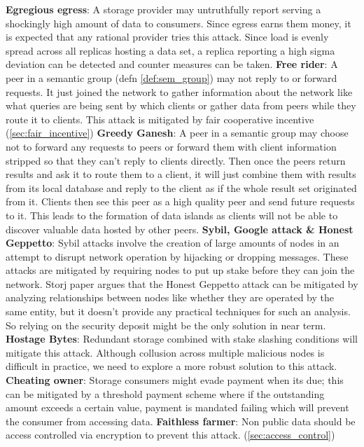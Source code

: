 \newline\newline
\textbf{Egregious egress}: A storage provider may untruthfully report serving a shockingly high amount of data to consumers. Since egress earns them money, it is expected that any rational provider tries this attack. Since load is evenly spread across all replicas hosting a data set, a replica reporting a high sigma deviation can be detected and counter measures can be taken. 
\newline\newline
\textbf{Free rider}: A peer in a semantic group (defn \ref{def:sem_group}) may not reply to or forward requests. It just joined the network to gather information about the network like what queries are being sent by which clients or gather data from peers while they route it to clients. This attack is mitigated by fair cooperative incentive (\cref{sec:fair_incentive})
\newline\newline
\textbf{Greedy Ganesh}: A peer in a semantic group may choose not to forward any requests to peers or forward them with client information stripped so that they can't reply to clients directly. Then once the peers return results and ask it to route them to a client, it will just combine them with results from its local database and reply to the client as if the whole result set originated from it. Clients then see this peer as a high quality peer and send future requests to it. This leads to the formation of data islands as clients will not be able to discover valuable data hosted by other peers.
\newline\newline
\textbf{Sybil, Google attack \& Honest Geppetto}: Sybil attacks involve the creation of large amounts of nodes in an attempt to disrupt network operation by hijacking or dropping messages. These attacks are mitigated by requiring nodes to put up stake before they can join the network. Storj paper \cite{Storj} argues that the Honest Geppetto attack can be mitigated by analyzing relationships between nodes like whether they are operated by the same entity, but it doesn't provide any practical techniques for such an analysis. So relying on the security deposit might be the only solution in near term.
\newline\newline
\textbf{Hostage Bytes}: Redundant storage combined with stake slashing conditions will mitigate this attack. Although collusion across multiple malicious nodes is difficult in practice, we need to explore a more robust solution to this attack.
\newline\newline
\textbf{Cheating owner}: Storage consumers might evade payment when its due; this can be mitigated by a threshold payment scheme where if the outstanding amount exceeds a certain value, payment is mandated failing which will prevent the consumer from accessing data.
\newline\newline
\textbf{Faithless farmer}: Non public data should be access controlled via encryption to prevent this attack. (\cref{sec:access_control}) 

